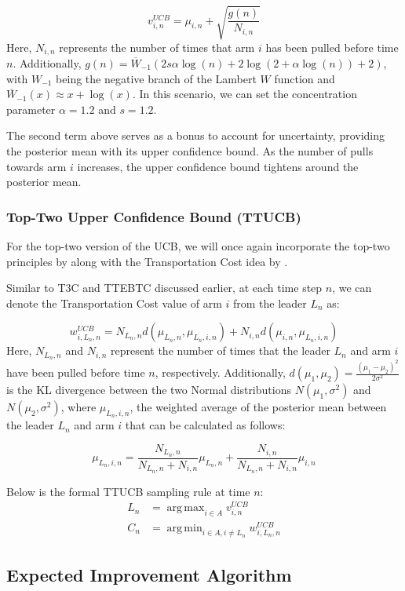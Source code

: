 \documentclass[a4paper, 12pt]{article}
\DeclareMathOperator{\argmax}{arg\,max}
\DeclareMathOperator{\argmin}{arg\,min}
\theoremstyle{definition}
\begin{document}
\[
v_{i,n}^{UCB} = \mu_{i,n} + \sqrt{\frac{g(n)}{N_{i,n}}}     
\]
Here, $N_{i,n}$ represents the number of times that arm $i$ has been pulled before time $n$. Additionally, $g(n) = \overline{W}_{-1}(2s\alpha \log(n) + 2\log(2+\alpha \log(n)) +2)$, with $W_{-1}$ being the negative branch of the Lambert $W$ function and $\overline{W}_{-1}(x) \approx x + \log(x)$. In this scenario, we can set the concentration parameter $\alpha=1.2$ and $s=1.2$.

The second term above serves as a bonus to account for uncertainty, providing the posterior mean with its upper confidence bound. As the number of pulls towards arm $i$ increases, the upper confidence bound tightens around the posterior mean.

\subsubsection{Top-Two Upper Confidence Bound (TTUCB)}
For the top-two version of the UCB, we will once again incorporate the top-two principles by \cite{toptwo} along with the Transportation Cost idea by \cite{ttucb2}.

Similar to T3C and TTEBTC discussed earlier, at each time step $n$, we can denote the Transportation Cost value of arm $i$ from the leader $L_n$ as:

\[
w_{i,L_n,n}^{UCB} = N_{L_n,n} d(\mu_{L_n,n},\mu_{L_n,i,n})+ N_{i,n} d(\mu_{i,n},\mu_{L_n,i,n})     
\]
Here, $N_{L_n,n}$ and $N_{i,n}$ represent the number of times that the leader $L_n$ and arm $i$ have been pulled before time $n$, respectively. Additionally, $d(\mu_1,\mu_2) = \frac{(\mu_1 - \mu_2)^2}{2\sigma^2}$ is the KL divergence between the two Normal distributions $N(\mu_1,\sigma^2)$ and $N(\mu_2,\sigma^2)$, where $\mu_{L_n,i,n}$, the weighted average of the posterior mean between the leader $L_n$ and arm $i$ that can be calculated as follows:

\[
\mu_{L_n,i,n} = \frac{N_{L_n,n}}{N_{L_n,n}+N_{i,n}} \mu_{L_n,n} + \frac{N_{i,n}}{N_{L_n,n}+N_{i,n}} \mu_{i,n}  
\]

Below is the formal TTUCB sampling rule at time $n$:
\begin{align} \label{eq:ttucb}
L_n & = \argmax_{i\in A} v_{i,n}^{UCB} \nonumber \\
C_n & = \argmin_{i\in A,i\neq L_n} w_{i,L_n,n}^{UCB}
\end{align}


\subsection{Expected Improvement Algorithm}
\end{document}
